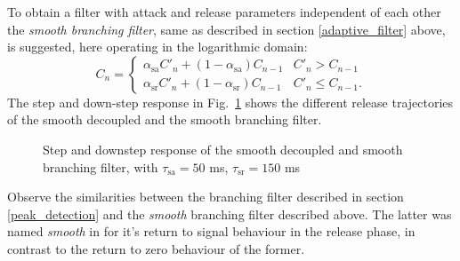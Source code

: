 \documentclass[../main2.tex]{subfiles}
\providecommand{\rootdir}{..}
\begin{document}
To obtain a filter with attack and release parameters independent of each other the \emph{smooth branching filter}, same as described in section \ref{adaptive_filter} above, is suggested, here operating in the logarithmic domain:
\begin{equation}\label{eq:smooth_branching_det}
C_n = \begin{cases}
    \alpha_\text{sa} C'_n + (1-\alpha_\text{sa}) C_{n-1} 	& C'_n > C_{n-1} \\
    \alpha_\text{sr} C'_n + (1-\alpha_\text{sr}) C_{n-1} 	& C'_n \leq C_{n-1}.
\end{cases}
\end{equation}
The step and down-step response in Fig.~\ref{fig:step_reiss_filter} shows the different release trajectories of the smooth decoupled and the smooth branching filter.%
\begin{figure}
\centerline{}
\caption{Step and downstep response of the smooth decoupled and smooth branching filter, with $\tau_\text{sa} = 50$ ms, $\tau_\text{sr} = 150$ ms}
\label{fig:step_reiss_filter}
\end{figure}

Observe the similarities between the branching filter described in section \ref{peak_detection} and the \emph{smooth} branching filter described above. The latter was named \emph{smooth} in \cite{reiss2012tutorial} for it's return to signal behaviour in the release phase, in contrast to the return to zero behaviour of the former.
\end{document}
